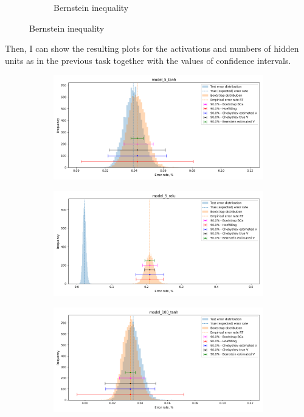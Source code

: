 \documentclass[a4paper,11pt]{article}
\begin{document}
\begin{figure}[ht]
\begin{subfigure}[b]{0.9\textwidth}
        \caption*{Bernstein inequality}
    \end{subfigure}
\end{figure}

\newpage

Then, I can show the resulting plots for the activations and numbers of hidden units as in the previous task together with the values of confidence intervals.
\begin{figure}[ht]
    \centering
    \begin{subfigure}[b]{0.45\textwidth}
        \includegraphics[width=\textwidth]{../errors/model_5_tanh.png}
    \end{subfigure}
    \hfill
    \begin{subfigure}[b]{0.45\textwidth}
        \includegraphics[width=\textwidth]{../errors/model_5_relu.png}
    \end{subfigure}
    \begin{subfigure}[b]{0.45\textwidth}
        \includegraphics[width=\textwidth]{../errors/model_100_tanh.png}

\end{subfigure}
\end{figure}
\end{document}
